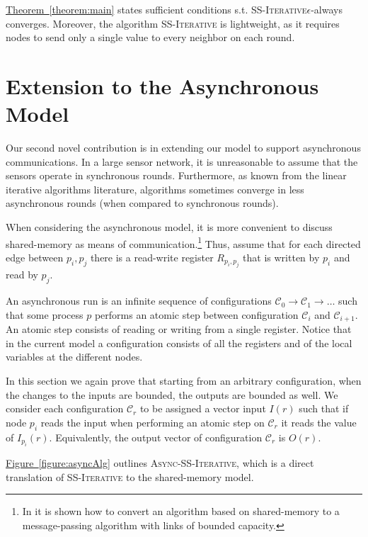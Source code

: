 \documentclass[preprint,12pt]{elsarticle}
\newcommand{\namedref}[2]{\hyperref[#2]{#1~\ref*{#2}}}
\newcommand{\theoremref}[1]{\namedref{Theorem}{#1}}
\newcommand{\figureref}[1]{\namedref{Figure}{#1}}
\newcommand\C{\mathcal{C}}
\newcommand{\syncAlg}{\textsc{SS-Iterative}\xspace}
\newcommand{\asyncAlg}{\textsc{Async-SS-Iterative}\xspace}
\newcommand{\Ir}[1]{I(#1)}
\newcommand{\Or}[1]{O(#1)}
\newcommand{\II}[2]{I_{#1}(#2)}
\begin{document}
\theoremref{theorem:main} states sufficient conditions s.t. \syncAlg $\epsilon$-always
converges. Moreover, the algorithm \syncAlg is lightweight, as it
requires nodes to send only a single value to every neighbor on each
round.



\section{Extension to the Asynchronous Model}\label{sec:async}
Our second novel contribution is in extending our model to support
asynchronous communications. In a large sensor network, it is
unreasonable to assume that the sensors operate in synchronous
rounds. Furthermore, as known from the linear iterative algorithms
literature, algorithms
sometimes
converge in less asynchronous rounds (when compared to synchronous rounds).

When considering the asynchronous model, it is more convenient to
discuss shared-memory as means of communication.\footnote{In
\cite{DolevSSBook} it is shown how to convert an algorithm based
on shared-memory to a message-passing algorithm with links of
bounded capacity.} Thus, assume that for each directed edge
between $p_i, p_j$ there is a read-write register $R_{p_i,p_j}$
that is written by $p_i$ and read by $p_j$.

An asynchronous run is an infinite sequence of configurations $\C_0
\rightarrow \C_1 \rightarrow \dots$ such that some process $p$
performs an atomic step between configuration $\C_i$ and
$\C_{i+1}$. An atomic step consists of reading or writing from a
single register. Notice that in the current model a configuration
consists of all the registers and of the local variables at the
different nodes.

In this section we again prove that starting from an arbitrary
configuration, when the changes to the inputs are bounded, the outputs are
bounded as well. We consider each configuration $\C_r$ to be
assigned a vector input $\Ir{r}$ such that if node $p_i$ reads the
input when performing an atomic step on $\C_r$ it reads the value
of $\II{p_i}{r}$. Equivalently, the output vector of configuration
$\C_r$ is $\Or{r}$.

\figureref{figure:asyncAlg} outlines \asyncAlg, which is a direct
translation of \syncAlg to the shared-memory model.
\end{document}
